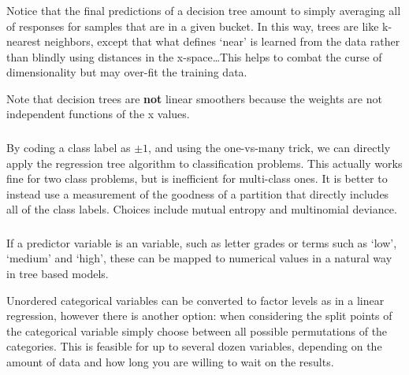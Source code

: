 \documentclass[xetex,mathserif,serif,aspectratio=169]{beamer}
\begin{document}
\begin{frame}[fragile] \frametitle{} \oldB \small

\textbf{}

Notice that the final predictions of a decision tree amount to simply
averaging all of responses for samples that are in a given bucket. In
this way, trees are like k-nearest neighbors, except that what defines
`near' is learned from the data rather than blindly using distances in
the x-space\ldots This helps to combat the curse of dimensionality but
may over-fit the training data.

Note that decision trees are \textbf{not} linear smoothers because the
weights are not independent functions of the x values.

\end{frame}

\begin{frame}[fragile] \frametitle{} \oldB \small

\textbf{}

By coding a class label as $\pm 1$, and using the one-vs-many trick, we
can directly apply the regression tree algorithm to classification problems.
This actually works fine for two class problems, but is inefficient for
multi-class ones. It is better to instead use a measurement of the goodness
of a partition that directly includes all of the class labels. Choices
include mutual entropy and multinomial deviance.

\end{frame}

\begin{frame}[fragile] \frametitle{} \oldB \small

\textbf{}

If a predictor variable is an  variable, such as letter
grades or terms such as `low', `medium' and `high', these can be
mapped to numerical values in a natural way in tree based models.

Unordered categorical variables can be converted to factor levels as
in a linear regression, however there is another option: when considering
the split points of the categorical variable simply choose between all
possible permutations of the categories. This is feasible for up to
several dozen variables, depending on the amount of data and how long
you are willing to wait on the results.

\end{frame}
\end{document}

